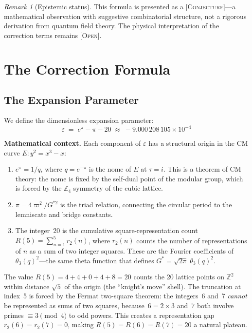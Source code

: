 \documentclass[11pt,twoside]{article}
\theoremstyle{remark}
\newtheorem{remark}{Remark}
\newcommand{\etag}[1]{\textsc{\small[#1]}}
\newcommand{\conj}{\etag{Conjecture}}
\newcommand{\openq}{\etag{Open}}
\newcommand{\eps}{\varepsilon}
\begin{document}
\begin{remark}[Epistemic status]
This formula is presented as a \conj---a mathematical observation with suggestive combinatorial structure, not a rigorous derivation from quantum field theory.
The physical interpretation of the correction terms remains \openq.
\end{remark}


\section{The Correction Formula}
\label{sec:formula}

\subsection{The Expansion Parameter}
\label{sec:epsilon}

We define the dimensionless expansion parameter:
\begin{equation}
\label{eq:epsilon}
    \boxed{\;\eps \;=\; e^{\pi} - \pi - 20 \;\approx\; -9.000\,208\,105 \times 10^{-4}\;}
\end{equation}

\noindent\textbf{Mathematical context.}
Each component of $\eps$ has a structural origin in the CM curve $E\!: y^2 = x^3 - x$:

\begin{enumerate}[label=(\roman*), nosep]
    \item $e^{\pi} = 1/q$, where $q = e^{-\pi}$ is the nome of $E$ at $\tau = i$. This is a theorem of CM theory: the nome is fixed by the self-dual point of the modular group, which is forced by the $\mathbb{Z}_4$ symmetry of the cubic lattice.

    \item $\pi = 4\varpi^2/G^{*2}$ is the triad relation, connecting the circular period to the lemniscate and bridge constants.

    \item The integer~20 is the cumulative square-representation count $R(5) = \sum_{n=1}^{5} r_2(n)$, where $r_2(n)$ counts the number of representations of $n$ as a sum of two integer squares. These are the Fourier coefficients of $\theta_3(q)^2$---the same theta function that defines $G^* = \sqrt{2\pi}\;\theta_3(q)^2$.
\end{enumerate}

\noindent The value $R(5) = 4 + 4 + 0 + 4 + 8 = 20$ counts the 20 lattice points on $\mathbb{Z}^2$ within distance $\sqrt{5}$ of the origin (the ``knight's move'' shell). The truncation at index~5 is forced by the Fermat two-square theorem: the integers~6 and~7 \emph{cannot} be represented as sums of two squares, because~$6 = 2 \times 3$ and~$7$ both involve primes $\equiv 3\pmod{4}$ to odd powers. This creates a representation gap $r_2(6) = r_2(7) = 0$, making $R(5) = R(6) = R(7) = 20$ a natural plateau.
\end{document}
